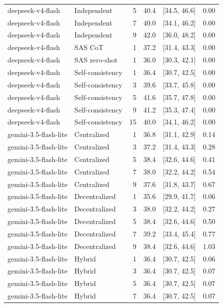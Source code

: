 \begin{tabular}{@{}llrrrr@{}}
deepseek-v4-flash & Independent & 5 & 40.4 & [34.5, 46.6] & 0.00 \\
deepseek-v4-flash & Independent & 7 & 40.0 & [34.1, 46.2] & 0.00 \\
deepseek-v4-flash & Independent & 9 & 42.0 & [36.0, 48.2] & 0.00 \\
deepseek-v4-flash & SAS CoT & 1 & 37.2 & [31.4, 43.3] & 0.00 \\
deepseek-v4-flash & SAS zero-shot & 1 & 36.0 & [30.3, 42.1] & 0.00 \\
deepseek-v4-flash & Self-consistency & 1 & 36.4 & [30.7, 42.5] & 0.00 \\
deepseek-v4-flash & Self-consistency & 3 & 39.6 & [33.7, 45.8] & 0.00 \\
deepseek-v4-flash & Self-consistency & 5 & 41.6 & [35.7, 47.8] & 0.00 \\
deepseek-v4-flash & Self-consistency & 9 & 41.2 & [35.3, 47.4] & 0.00 \\
deepseek-v4-flash & Self-consistency & 15 & 40.0 & [34.1, 46.2] & 0.00 \\
gemini-3.5-flash-lite & Centralized & 1 & 36.8 & [31.1, 42.9] & 0.14 \\
gemini-3.5-flash-lite & Centralized & 3 & 37.2 & [31.4, 43.3] & 0.28 \\
gemini-3.5-flash-lite & Centralized & 5 & 38.4 & [32.6, 44.6] & 0.41 \\
gemini-3.5-flash-lite & Centralized & 7 & 38.0 & [32.2, 44.2] & 0.54 \\
gemini-3.5-flash-lite & Centralized & 9 & 37.6 & [31.8, 43.7] & 0.67 \\
gemini-3.5-flash-lite & Decentralized & 1 & 35.6 & [29.9, 41.7] & 0.06 \\
gemini-3.5-flash-lite & Decentralized & 3 & 38.0 & [32.2, 44.2] & 0.27 \\
gemini-3.5-flash-lite & Decentralized & 5 & 38.4 & [32.6, 44.6] & 0.50 \\
gemini-3.5-flash-lite & Decentralized & 7 & 39.2 & [33.4, 45.4] & 0.77 \\
gemini-3.5-flash-lite & Decentralized & 9 & 38.4 & [32.6, 44.6] & 1.03 \\
gemini-3.5-flash-lite & Hybrid & 1 & 36.4 & [30.7, 42.5] & 0.06 \\
gemini-3.5-flash-lite & Hybrid & 3 & 36.4 & [30.7, 42.5] & 0.07 \\
gemini-3.5-flash-lite & Hybrid & 5 & 36.4 & [30.7, 42.5] & 0.07 \\
gemini-3.5-flash-lite & Hybrid & 7 & 36.4 & [30.7, 42.5] & 0.07 \\

\end{tabular}
